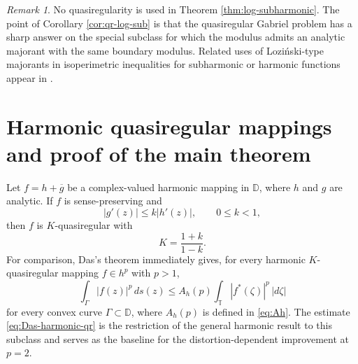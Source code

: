 \documentclass[11pt]{article}
\theoremstyle{definition}
\theoremstyle{remark}
\newtheorem{remark}[theorem]{Remark}
\newcommand{\D}{\mathbb D}
\newcommand{\T}{\mathbb T}
\newcommand{\ds}{\,ds}
\begin{document}
\begin{remark}
No quasiregularity is used in Theorem \ref{thm:log-subharmonic}. The point of Corollary \ref{cor:qr-log-sub} is that the quasiregular Gabriel problem has a sharp answer on the special subclass for which the modulus admits an analytic majorant with the same boundary modulus. Related uses of Lozi\'nski-type majorants in isoperimetric inequalities for subharmonic or harmonic functions appear in \cite{Mateljevic2015,MateljevicPurtic2025}.
\end{remark}

\section{Harmonic quasiregular mappings and proof of the main theorem}\label{sec:harmonic-main}

Let $f=h+\overline g$ be a complex-valued harmonic mapping in $\D$, where $h$ and $g$ are analytic. If $f$ is sense-preserving and
\[
   |g'(z)|\le k|h'(z)|, \qquad 0\le k<1,
\]
then $f$ is $K$-quasiregular with
\[
   K=\frac{1+k}{1-k}.
\]
For comparison, Das's theorem immediately gives, for every harmonic $K$-quasiregular mapping $f\in h^p$ with $p>1$,
\begin{equation}\label{eq:Das-harmonic-qr}
   \int_\Gamma |f(z)|^p\ds(z)
   \le A_h(p)\int_\T |f^*(\zeta)|^p\,|d\zeta|
\end{equation}
for every convex curve $\Gamma\subset\D$, where $A_h(p)$ is defined in \eqref{eq:Ah}. The estimate \eqref{eq:Das-harmonic-qr} is the restriction of the general harmonic result to this subclass and serves as the baseline for the distortion-dependent improvement at $p=2$.
\end{document}
